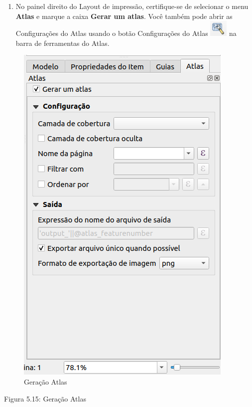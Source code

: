 \documentclass[
]{book}
\providecommand{\tightlist}{%
  \setlength{\itemsep}{0pt}\setlength{\parskip}{0pt}}
\begin{document}
\begin{enumerate}
\def\labelenumi{\arabic{enumi}.}
\setcounter{enumi}{2}
\tightlist
\item
  No painel direito do Layout de impressão, certifique-se de selecionar o menu \textbf{Atlas} e marque a caixa \textbf{Gerar um atlas}. Você também pode abrir as Configurações do Atlas usando o botão Configurações do Atlas \includegraphics{media/modulo5/atlas-settings-btn.png} na barra de ferramentas do Atlas.
\end{enumerate}

\begin{figure}
\centering
\includegraphics{media/modulo5/generate-atlas.png}
\caption{Geração Atlas}
\end{figure}

Figura 5.15: Geração Atlas
\end{document}
